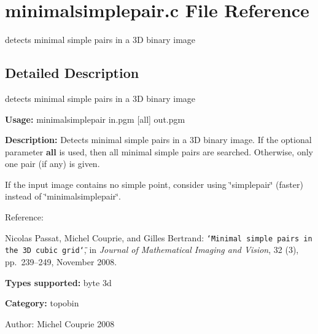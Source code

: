 \section{minimalsimplepair.c File Reference}
\label{minimalsimplepair_8c}
detects minimal simple pairs in a 3D binary image  




\label{_details}
\subsection{Detailed Description}
detects minimal simple pairs in a 3D binary image 

{\bf Usage:} minimalsimplepair in.pgm [all] out.pgm

{\bf Description:} Detects minimal simple pairs in a 3D binary image. If the optional parameter {\bf all} is used, then all minimal simple pairs are searched. Otherwise, only one pair (if any) is given.

If the input image contains no simple point, consider using \char`\"{}simplepair\char`\"{} (faster) instead of \char`\"{}minimalsimplepair\char`\"{}.

Reference:\par
 [PCB08] Nicolas Passat, Michel Couprie, and Gilles Bertrand: {\tt \char`\"{}Minimal simple pairs in the 3D cubic grid\char`\"{}}, in {\em Journal of Mathematical Imaging and Vision\/}, 32 (3), pp.~239–249, November 2008.\par


{\bf Types supported:} byte 3d

{\bf Category:} topobin

\begin{Desc}
\item[Author:]Michel Couprie 2008 \end{Desc}
